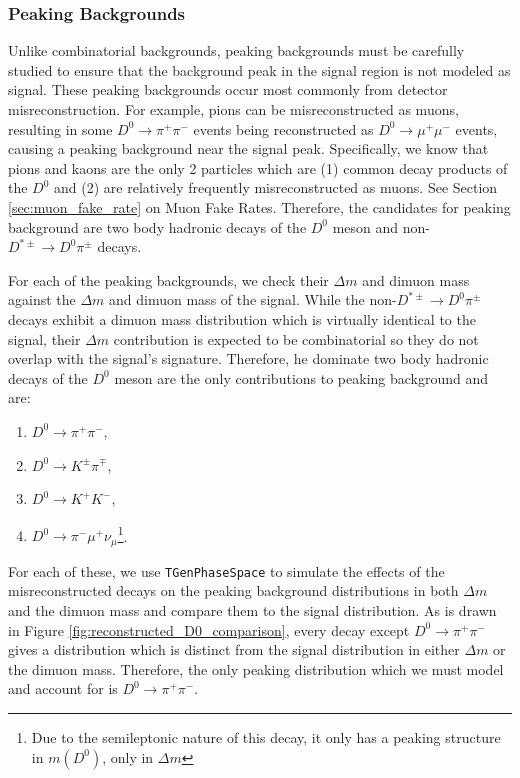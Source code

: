 \subsubsection{Peaking Backgrounds}

Unlike combinatorial backgrounds, peaking backgrounds must be carefully studied to ensure that the background peak in the signal region is not modeled as signal. These peaking backgrounds occur most commonly from detector misreconstruction. For example, pions can be misreconstructed as muons, resulting in some $D^0 \to \pi^+ \pi^-$ events being reconstructed as $D^0 \to \mu^+ \mu^-$ events, causing a peaking background near the signal peak. Specifically, we know that pions and kaons are the only 2 particles which are (1) common decay products of the $D^0$ and (2) are relatively frequently misreconstructed as muons. See Section \ref{sec:muon_fake_rate} on Muon Fake Rates. Therefore, the candidates for peaking background are two body hadronic decays of the $D^0$ meson and non-$D^{*\pm} \to D^0 \pi^\pm$ decays. 

For each of the peaking backgrounds, we check their $\Delta m$ and dimuon mass against the $\Delta m$ and dimuon mass of the signal. While the non-$D^{*\pm} \to D^0 \pi^\pm$ decays exhibit a dimuon mass distribution which is virtually identical to the signal, their $\Delta m$ contribution is expected to be combinatorial so they do not overlap with the signal's signature. Therefore, he dominate two body hadronic decays of the $D^0$ meson are the only contributions to peaking background and are:
\begin{enumerate}
    \item $D^0 \to \pi^+ \pi^-$,
    \item $D^0 \to K^\pm \pi^\mp$,
    \item $D^0 \to K^+ K^-$,
    \item $D^0 \to \pi^- \mu^+ \nu_\mu$\footnote{Due to the semileptonic nature of this decay, it only has a peaking structure in $m(D^0)$, only in $\Delta m$}.
\end{enumerate}
For each of these, we use \texttt{TGenPhaseSpace} to simulate the effects of the misreconstructed decays on the peaking background distributions in both $\Delta m$ and the dimuon mass and compare them to the signal distribution. As is drawn in Figure \ref{fig:reconstructed_D0_comparison}, every decay except $D^0 \to \pi^+ \pi^-$ gives a distribution which is distinct from the signal distribution in either $\Delta m$ or the dimuon mass. Therefore, the only peaking distribution which we must model and account for is $D^0 \to \pi^+ \pi^-$. 

